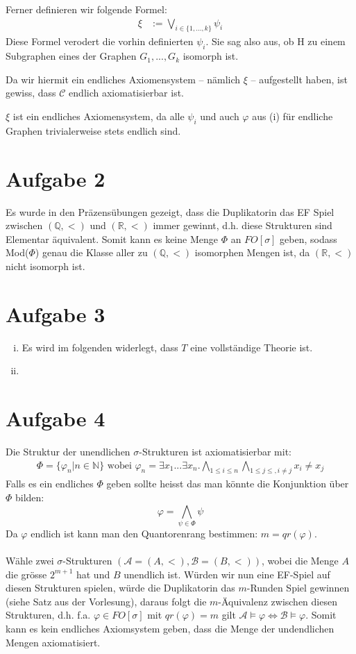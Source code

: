 \documentclass[a4paper,10pt]{article}
\newcommand{\N}{\mathbb{N}}
\begin{document}
\begin{enumerate}[(i)]
Ferner definieren wir folgende Formel:
\begin{align*}
\xi &:= \bigvee_{i \in \{1,...,k\}} \psi_i
\end{align*}
Diese Formel verodert die vorhin definierten $\psi_i$. Sie sag also aus, ob H zu einem Subgraphen eines der Graphen $G_1,...,G_k$ isomorph ist.

Da wir hiermit ein endliches Axiomensystem -- nämlich $\xi$ -- aufgestellt haben, ist gewiss, dass $\mathcal C$ endlich axiomatisierbar ist.

$\xi$ ist ein endliches Axiomensystem, da alle $\psi_i$ und auch $\varphi$ aus (i) für endliche Graphen trivialerweise stets endlich sind. 

\section*{Aufgabe 2}
Es wurde in den Präzensübungen gezeigt, dass die Duplikatorin das EF Spiel zwischen $(\mathbb{Q},<)$ und $(\mathbb{R},<)$ immer gewinnt, d.h. diese Strukturen sind Elementar äquivalent.
Somit kann es keine Menge $\Phi$ an $FO[\sigma]$ geben, sodass Mod($\Phi$) genau die Klasse aller zu $(\mathbb{Q},<)$ isomorphen Mengen ist, da $(\mathbb{R},<)$ nicht isomorph ist.
\section*{Aufgabe 3}
\begin{enumerate}[(i)]
	\item Es wird im folgenden widerlegt, dass $T$ eine vollständige Theorie ist.
	\item 
\end{enumerate}

\section*{Aufgabe 4}
Die Struktur der unendlichen $\sigma$-Strukturen ist axiomatisierbar mit:
\begin{align*}
	\Phi = \{\varphi_n | n \in \N \} \text{ wobei } \varphi_n = \exists x_1 ... \exists x_n. \bigwedge_{1  \le i \le n} \bigwedge_{1 \le j \le, i \neq j} x_i \neq x_j
\end{align*}
Falls es ein endliches $\Phi$ geben sollte heisst das man könnte die Konjunktion über $\Phi$ bilden:
\[\varphi = \bigwedge_{\psi \in \Phi} \psi \]
Da $\varphi$ endlich ist kann man den Quantorenrang bestimmen: $m = qr(\varphi)$. \\
\\
Wähle zwei $\sigma$-Strukturen $(\mathcal{A} = (A,<),\mathcal{B} = (B,<))$, wobei die Menge $A$ die grösse $2^{m+1}$ hat und $B$ unendlich ist. Würden wir nun eine EF-Spiel auf diesen Strukturen spielen, würde die Duplikatorin das $m$-Runden Spiel gewinnen (siehe Satz aus der Vorlesung), daraus folgt die $m$-Äquivalenz zwischen diesen Strukturen, d.h. f.a. $\varphi \in FO[\sigma] $ mit $qr(\varphi) = m$ gilt $\mathcal{A} \vDash \varphi \Leftrightarrow \mathcal{B} \vDash \varphi$. Somit kann es kein endliches Axiomsystem geben, dass die Menge der undendlichen Mengen axiomatisiert.

\end{enumerate}
\end{document}
